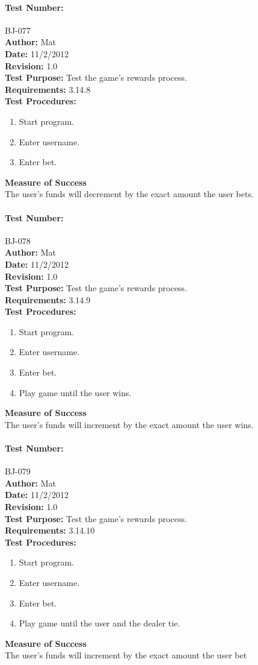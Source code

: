 \documentclass{article}
\begin{document}
\paragraph{Test Number:} BJ-077\\
\textbf{Author:} Mat\\
\textbf{Date:} 11/2/2012\\
\textbf{Revision:} 1.0\\
\textbf{Test Purpose:} Test the game's rewards process.\\
\textbf{Requirements:} 3.14.8 \\
\textbf{Test Procedures:} 
\begin{enumerate}
\item Start program.
\item Enter username.
\item Enter bet.
\end{enumerate}
\textbf{Measure of Success}\\The user's funds will decrement by the exact amount the user bets.
\paragraph{Test Number:} BJ-078\\
\textbf{Author:} Mat\\
\textbf{Date:} 11/2/2012\\
\textbf{Revision:} 1.0\\
\textbf{Test Purpose:} Test the game's rewards process.\\
\textbf{Requirements:} 3.14.9 \\
\textbf{Test Procedures:} 
\begin{enumerate}
\item Start program.
\item Enter username.
\item Enter bet.
\item Play game until the user wins.
\end{enumerate}
\textbf{Measure of Success}\\The user's funds will increment by the exact amount the user wins.
\paragraph{Test Number:} BJ-079\\
\textbf{Author:} Mat\\
\textbf{Date:} 11/2/2012\\
\textbf{Revision:} 1.0\\
\textbf{Test Purpose:} Test the game's rewards process.\\
\textbf{Requirements:} 3.14.10 \\
\textbf{Test Procedures:} 
\begin{enumerate}
\item Start program.
\item Enter username.
\item Enter bet.
\item Play game until the user and the dealer tie.
\end{enumerate}
\textbf{Measure of Success}\\The user's funds will increment by the exact amount the user bet
\end{document}

